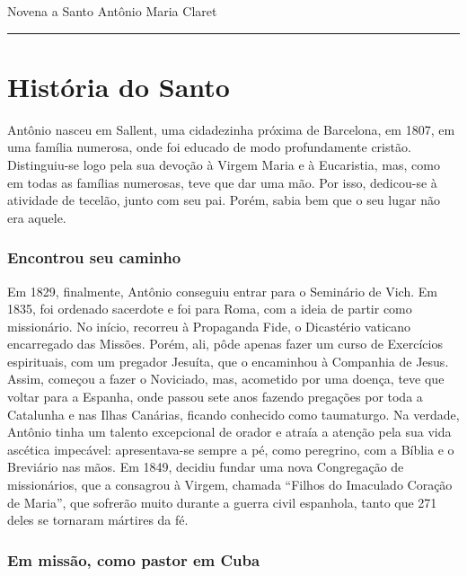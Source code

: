 \documentclass[a4paper,14pt]{extarticle} \usepackage[utf8]{inputenc}
\begin{document}
\begin{center}
  {\huge Novena a Santo Antônio Maria Claret}
\end{center}

\par\noindent\rule{\textwidth}{0.4pt}

\tableofcontents
\thispagestyle{empty}

\newpage
\section{História do Santo}
Antônio nasceu em Sallent, uma cidadezinha próxima de Barcelona, em 1807, em uma família numerosa, onde foi educado de modo profundamente cristão. Distinguiu-se logo pela sua devoção à Virgem Maria e à Eucaristia, mas, como em todas as famílias numerosas, teve que dar uma mão. Por isso, dedicou-se à atividade de tecelão, junto com seu pai. Porém, sabia bem que o seu lugar não era aquele.

\subsubsection{Encontrou seu caminho}

Em 1829, finalmente, Antônio conseguiu entrar para o Seminário de Vich. Em 1835, foi ordenado sacerdote e foi para Roma, com a ideia de partir como missionário. No início, recorreu à Propaganda Fide, o Dicastério vaticano encarregado das Missões. Porém, ali, pôde apenas fazer um curso de Exercícios espirituais, com um pregador Jesuíta, que o encaminhou à Companhia de Jesus. Assim, começou a fazer o Noviciado, mas, acometido por uma doença, teve que voltar para a Espanha, onde passou sete anos fazendo pregações por toda a Catalunha e nas Ilhas Canárias, ficando conhecido como taumaturgo. Na verdade, Antônio tinha um talento excepcional de orador e atraía a atenção pela sua vida ascética impecável: apresentava-se sempre a pé, como peregrino, com a Bíblia e o Breviário nas mãos. Em 1849, decidiu fundar uma nova Congregação de missionários, que a consagrou à Virgem, chamada “Filhos do Imaculado Coração de Maria”, que sofrerão muito durante a guerra civil espanhola, tanto que 271 deles se tornaram mártires da fé.

\subsubsection{Em missão, como pastor em Cuba}
\end{document}
